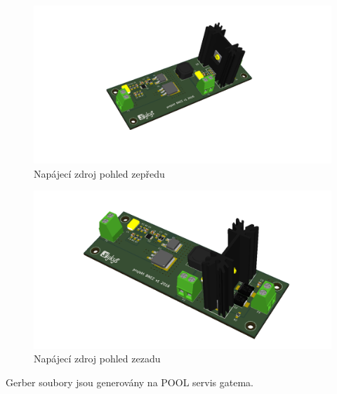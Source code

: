 \begin{figure}[H]
	\centering 	
	\includegraphics[width=\textwidth]{../design/img/xvykyd06_zdroj_4.png}
	\caption{Napájecí zdroj pohled zepředu}	
\end{figure}

\begin{figure}[H]
	\centering 	
	\includegraphics[width=\textwidth]{../design/img/xvykyd06_zdroj_1.png}
	\caption{Napájecí zdroj pohled zezadu}	
\end{figure}





Gerber soubory jsou generovány na POOL servis gatema.